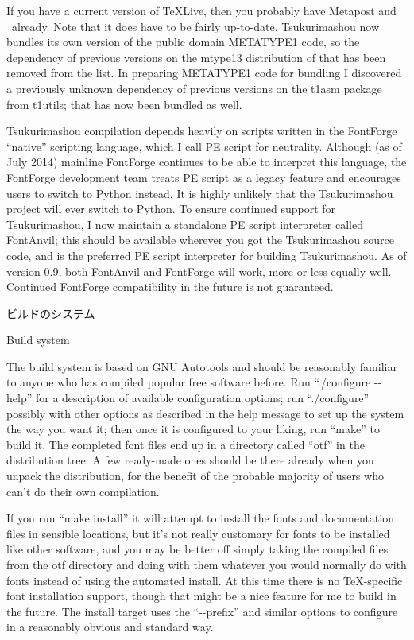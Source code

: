 \documentclass[14pt]{extarticle}
\newcommand{\blsubsection}[2]{%
\kaku\large#1\qquad\phantomsection%
\addcontentsline{toc}{subsection}{#1 #2}%
#2\par\addpenalty{-300}\normalsize}
\begin{document}
If you have a current version of \TeX{}Live, then you probably have
Metapost and \XeLaTeX\ already.  Note that it does have to be fairly
up-to-date.  Tsukurimashou now bundles its own version of the public domain
METATYPE1 code, so the dependency of previous versions
on the mtype13 distribution of that has been removed from the list.  In
preparing METATYPE1 code for bundling I discovered a previously unknown
dependency of previous versions on the t1asm package from t1utils; that has
now been bundled as well.

Tsukurimashou compilation depends heavily on scripts written in the
FontForge ``native'' scripting language, which I call PE script for
neutrality.  Although (as of July 2014) mainline FontForge continues to be
able to interpret this language, the FontForge development team treats PE
script as a legacy feature and encourages users to switch to Python instead. 
It is highly unlikely that the Tsukurimashou project will ever switch to
Python.  To ensure continued support for Tsukurimashou, I now maintain a
standalone PE script interpreter called FontAnvil; this should be available
wherever you got the Tsukurimashou source code, and is the preferred PE
script interpreter for building Tsukurimashou.  As of version 0.9, both
FontAnvil and FontForge will work, more or less equally well.  Continued
FontForge compatibility in the future is not guaranteed.


\blsubsection{ビルドのシステム}{Build system}

The build system is based on GNU Autotools and should be reasonably familiar
to anyone who has compiled popular free software before.  Run ``./configure
-{}-help'' for a description of available configuration options; run
``./configure'' possibly with other options as described in the help message
to set up the system the way you want it; then once it is configured to your
liking, run ``make'' to build it.  The completed font files end up in a
directory called ``otf'' in the distribution tree. A few ready-made ones
should be there already when you unpack the distribution, for the benefit of
the probable majority of users who can't do their own compilation.

If you run ``make install'' it will attempt to install the fonts and
documentation files in sensible locations, but it's not really customary for
fonts to be installed like other software, and you may be better off simply
taking the compiled files from the otf directory and doing with them
whatever you would normally do with fonts instead of using the
automated install.  At this time there is no \TeX-specific font installation
support, though that might be a nice feature for me to build in the future. 
The install target uses the ``-{}-prefix'' and similar options to configure
in a reasonably obvious and standard way.
\end{document}
